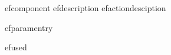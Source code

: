 \app{}efcomponent{}
\app{}efdescription{}
\app{}efactiondesciption{}{}
\begin{gdrefparam}
  \app{}efparamentry{}{}{}{}
\end{gdrefparam}
\app{}efused{}

